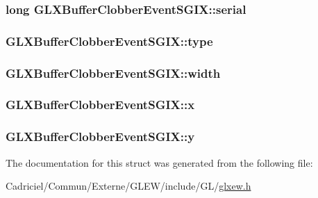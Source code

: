 \hypertarget{struct_g_l_x_buffer_clobber_event_s_g_i_x_ac295e3276a7986eeae4d6a2a28c7e0b7}{
\subsubsection[{serial}]{ {\bf long} G\-L\-X\-Buffer\-Clobber\-Event\-S\-G\-I\-X\-::serial}}\label{struct_g_l_x_buffer_clobber_event_s_g_i_x_ac295e3276a7986eeae4d6a2a28c7e0b7}
\hypertarget{struct_g_l_x_buffer_clobber_event_s_g_i_x_a36e3e8a5feea664623ea43d0f273b63a}{
\subsubsection[{type}]{ G\-L\-X\-Buffer\-Clobber\-Event\-S\-G\-I\-X\-::type}}\label{struct_g_l_x_buffer_clobber_event_s_g_i_x_a36e3e8a5feea664623ea43d0f273b63a}
\hypertarget{struct_g_l_x_buffer_clobber_event_s_g_i_x_adad23535733161528427584a42bfc6eb}{
\subsubsection[{width}]{ G\-L\-X\-Buffer\-Clobber\-Event\-S\-G\-I\-X\-::width}}\label{struct_g_l_x_buffer_clobber_event_s_g_i_x_adad23535733161528427584a42bfc6eb}
\hypertarget{struct_g_l_x_buffer_clobber_event_s_g_i_x_a5118d48c3c8d5253d39922b5014b52ff}{
\subsubsection[{x}]{ G\-L\-X\-Buffer\-Clobber\-Event\-S\-G\-I\-X\-::x}}\label{struct_g_l_x_buffer_clobber_event_s_g_i_x_a5118d48c3c8d5253d39922b5014b52ff}
\hypertarget{struct_g_l_x_buffer_clobber_event_s_g_i_x_aef21efa11558a5b67861f96471c56003}{
\subsubsection[{y}]{ G\-L\-X\-Buffer\-Clobber\-Event\-S\-G\-I\-X\-::y}}\label{struct_g_l_x_buffer_clobber_event_s_g_i_x_aef21efa11558a5b67861f96471c56003}


The documentation for this struct was generated from the following file\-:\begin{DoxyCompactItemize}
\item 
Cadriciel/\-Commun/\-Externe/\-G\-L\-E\-W/include/\-G\-L/\hyperlink{glxew_8h}{glxew.\-h}\end{DoxyCompactItemize}
